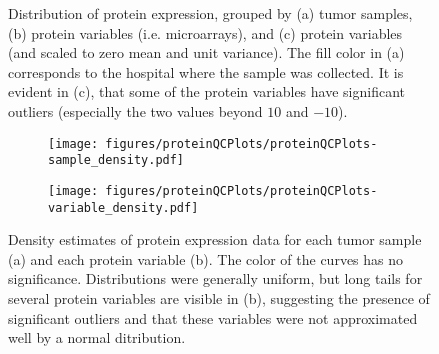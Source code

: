 \begin{figure}
	\centering
	\begin{subfigure}{1\textwidth}
		\centering
	\end{subfigure}
	\begin{subfigure}{1\textwidth}
		\centering
	\end{subfigure}
	\begin{subfigure}{1\textwidth}
		\centering
	\end{subfigure}

	\caption{Distribution of protein expression, grouped by
	(a) tumor samples,
	(b) protein variables (i.e. microarrays), 
	and (c) protein variables (and scaled to zero mean and unit variance).
	The fill color in (a) corresponds to the hospital where the sample was collected.
	It is evident in (c), that some of the protein variables have significant outliers
	(especially the two values beyond $10$ and $-10$).
	}
	\label{fig:qc-protein-boxplot}
\end{figure}


\begin{figure}[!h]
	\centering
	\begin{subfigure}{.49\textwidth}
		\texttt{[image: figures/proteinQCPlots/proteinQCPlots-sample\_density.pdf]}
	\end{subfigure}
	\begin{subfigure}{.49\textwidth}
		\texttt{[image: figures/proteinQCPlots/proteinQCPlots-variable\_density.pdf]}
	\end{subfigure}

	\caption{Density estimates of protein expression data for each tumor sample (a)
	and each protein variable (b). The color of the curves has no significance.
	Distributions were generally uniform, but
	long tails for several protein variables are visible in (b), suggesting the presence of significant
	outliers and that these variables were not approximated well by a normal ditribution.}
	\label{fig:qc-protein-density}
\end{figure}


